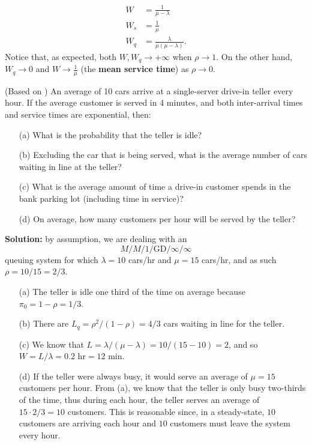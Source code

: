 \begin{align*}
W &= \frac{1}{\mu - \lambda}\\
W_{s} &= \frac{1}{\mu}\\
W_{q} &= \frac{\lambda}{\mu(\mu-\lambda)}.
 \end{align*}
Notice that, as expected, both $W,W_q\to +\infty$ when $\rho\to 1$. On the other hand, $W_{q}\to 0$ and $W\to \frac{1}{\mu}$ (the \textbf{mean service time}) as $\rho\to 0$.
\begin{Example} (Based on \cite{QS_W}) An average of 10 cars arrive at a single-server drive-in teller every hour. If the average customer is served in 4 minutes, and both inter-arrival times and service times are exponential, then: \begin{itemize}[noitemsep]
	\item[(a)] What is the probability that the teller is idle? 
	\item[(b)] Excluding the car that is being served, what is the average number of cars waiting in line at the teller? 
	\item[(c)] What is the average amount of time a drive-in customer spends in the bank parking lot (including time in service)?
	\item[(d)] On average, how many customers per hour will be served by the teller?
\end{itemize}
\textbf{Solution:} by assumption, we are dealing with an $$M/M/1/\textrm{GD}/\infty/\infty$$ queuing system for which $\lambda = 10$ cars/hr and $\mu = 15$ cars/hr, and as such  $\rho = 10/15 = 2/3$.
\begin{itemize}[noitemsep]
	\item[(a)] The teller is idle one third of the time on average because $\pi_{0} = 1 - \rho = 1/3$.
	\item[(b)] There are $L_{q} = \rho^{2}/(1-\rho) = 4/3$ cars waiting in line for the teller. 
	\item[(c)] We know that $L = \lambda/(\mu - \lambda) = 10/(15-10) = 2$, and so $W = L/\lambda = 0.2 \textrm{ hr} = 12 \textrm{ min}$.
	\item[(d)] If the teller were always busy, it would serve an average of $\mu = 15$ customers per hour. From (a), we know that the teller is only busy two-thirds of the time, thus during each hour, the teller serves an average of $15 \cdot 2/3 = 10$ customers. This is reasonable since, in a steady-state, $10$ customers are arriving each hour and $10$ customers must leave the system every hour.
\end{itemize}
\end{Example}
